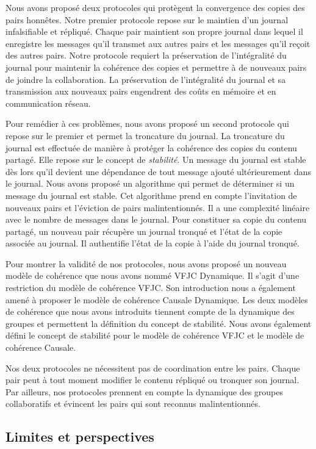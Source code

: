 Nous avons proposé deux protocoles qui protègent la convergence des copies des pairs honnêtes.
Notre premier protocole repose sur le maintien d'un journal infalsifiable et répliqué.
Chaque pair maintient son propre journal dans lequel il enregistre les messages qu'il transmet aux autres pairs et les messages qu'il reçoit des autres pairs.
Notre protocole requiert la préservation de l'intégralité du journal pour maintenir la cohérence des copies et permettre à de nouveaux pairs de joindre la collaboration.
La préservation de l'intégralité du journal et sa transmission aux nouveaux pairs engendrent des coûts en mémoire et en communication réseau.

Pour remédier à ces problèmes, nous avons proposé un second protocole qui repose sur le premier et permet la troncature du journal.
La troncature du journal est effectuée de manière à protéger la cohérence des copies du contenu partagé.
Elle repose sur le concept de \emph{stabilité}.
Un message du journal est stable dès lors qu'il devient une dépendance de tout message ajouté ultérieurement dans le journal.
Nous avons proposé un algorithme qui permet de déterminer si un message du journal est stable.
Cet algorithme prend en compte l'invitation de nouveaux pairs et l'éviction de pairs malintentionnés.
Il a une complexité linéaire avec le nombre de messages dans le journal.
Pour constituer sa copie du contenu partagé, un nouveau pair récupère un journal tronqué et l'état de la copie associée au journal.
Il authentifie l'état de la copie à l'aide du journal tronqué.

Pour montrer la validité de nos protocoles, nous avons proposé un nouveau modèle de cohérence que nous avons nommé \acl{VFJC} Dynamique.
Il s'agit d'une restriction du modèle de cohérence \acf{VFJC}.
Son introduction nous a également amené à proposer le modèle de cohérence Causale Dynamique.
Les deux modèles de cohérence que nous avons introduits tiennent compte de la dynamique des groupes et permettent la définition du concept de stabilité.
Nous avons également défini le concept de stabilité pour le modèle de cohérence \acs{VFJC} et le modèle de cohérence Causale.

Nos deux protocoles ne nécessitent pas de coordination entre les pairs.
Chaque pair peut à tout moment modifier le contenu répliqué ou tronquer son journal.
Par ailleurs, nos protocoles prennent en compte la dynamique des groupes collaboratifs et évincent les pairs qui sont reconnus malintentionnés.

\subsection{Limites et perspectives}

